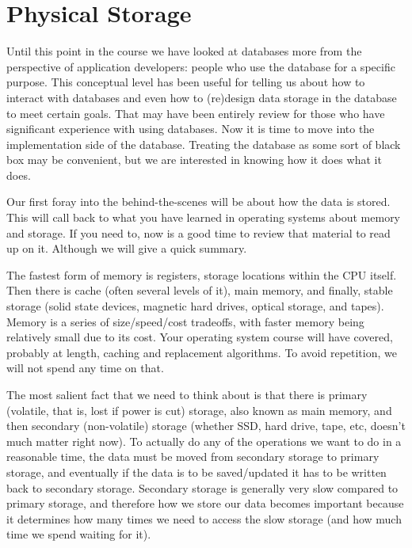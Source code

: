 




\section*{Physical Storage}

Until this point in the course we have looked at databases more from the perspective of application developers: people who use the database for a specific purpose. This conceptual level has been useful for telling us about how to interact with databases and even how to (re)design data storage in the database to meet certain goals. That may have been entirely review for those who have significant experience with using databases. Now it is time to move into the implementation side of the database. Treating the database as some sort of black box may be convenient, but we are interested in knowing how it does what it does. 

Our first foray into the behind-the-scenes will be about how the data is stored. This will call back to what you have learned in operating systems about memory and storage. If you need to, now is a good time to review that material to read up on it. Although we will give a quick summary. 

The fastest form of memory is registers, storage locations within the CPU itself. Then there is cache (often several levels of it), main memory, and finally, stable storage (solid state devices, magnetic hard drives, optical storage, and tapes). Memory is a series of size/speed/cost tradeoffs, with faster memory being relatively small due to its cost. Your operating system course will have covered, probably at length, caching and replacement algorithms. To avoid repetition, we will not spend any time on that.

The most salient fact that we need to think about is that there is primary (volatile, that is, lost if power is cut) storage, also known as main memory, and then secondary (non-volatile) storage (whether SSD, hard drive, tape, etc, doesn't much matter right now). To actually do any of the operations we want to do in a reasonable time, the data must be moved from secondary storage to primary storage, and eventually if the data is to be saved/updated it has to be written back to secondary storage. Secondary storage is generally very slow compared to primary storage, and therefore how we store our data becomes important because it determines how many times we need to access the slow storage (and how much time we spend waiting for it). 

